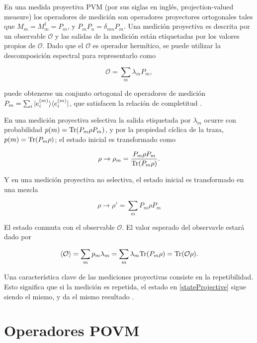 En una medida proyectiva PVM (por sus siglas en inglés, projection-valued measure) los operadores de medición son operadores proyectores ortogonales  tales que $M_{m}=M_{m}^{\dagger}=P_{m}$, y $P_{m}P_{n}=\delta_{mn}P_{m}$. Una medición proyectiva es descrita por un observable $\mathcal{O}$ y las salidas de la medición están etiquetadas por los valores propios de $\mathcal{O}$. Dado que el $\mathcal{O}$ es operador hermítico, se puede utilizar la descomposición espectral para representarlo como 

\begin{equation}
	\mathcal{O}=\sum_m \lambda_m P_m ,
\end{equation}

  puede obtenerse un conjunto ortogonal de operadores de medición $P_m=\sum_i |e_i^{(m)}\rangle \langle e_i^{(m)}|$, que satisfacen la relación de completitud {\cite{2007geometry}}. 



En una medición proyectiva selectiva la salida etiquetada por $\lambda_m$ ocurre con probabilidad $p(m)={\rm Tr}(P_m\rho P_m)$, y por la propiedad cíclica de la traza,  $p(m)={\rm Tr}(P_m\rho)$; el estado inicial es transformado como 

\begin{equation}\label{stateProjective}
	\rho\to	\rho_m=\dfrac{P_m\rho P_m}{{\rm Tr}(P_m \rho)}.
\end{equation}

 Y en una medición proyectiva no selectiva, el estado inicial es transformado en una mezcla 

\begin{equation}
	\rho \to \rho'=\sum_m P_m \rho P_m
\end{equation} 


El estado conmuta con el observable $\mathcal{O}$. El valor esperado del observavle estará dado por

\begin{equation}
	\langle \mathcal{O} \rangle=\sum_m p_m\lambda_m=\sum_m \lambda_m {\rm Tr}(P_m\rho)={\rm Tr}(\mathcal{O}\rho).
\end{equation}

Una característica clave de las mediciones proyectivas consiste en la repetibilidad. Esto significa que si la medición es repetida, el estado en {\ref{stateProjective}} sigue siendo el mismo, y da el mismo resultado {\cite{2007geometry}}.

\section{Operadores POVM}


